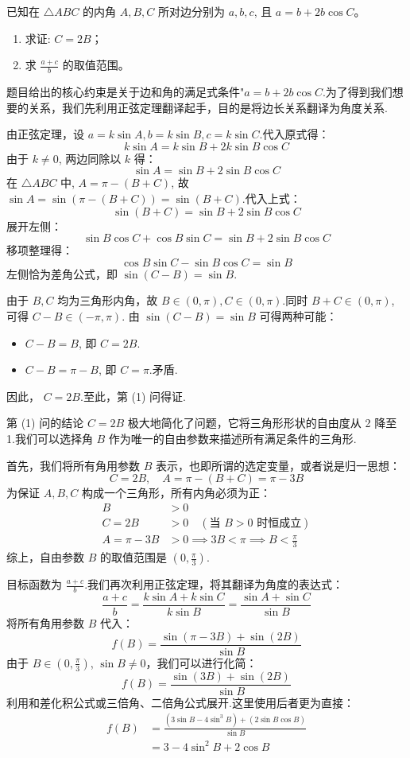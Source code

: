\begin{prob}[source={2023 年衡水中学第三次综合素养评价第 18 题}, topic={取值范围}]
已知在 $\triangle ABC$ 的内角 $A,B,C$ 所对边分别为 $a,b,c$, 且 $a=b+2b\cos C$。
\begin{enumerate}
	\item[(1)] 求证: $C=2B$；
	\item[(2)] 求 $\frac{a+c}{b}$ 的取值范围。
\end{enumerate}
\end{prob}
\begin{prob-sol}
题目给出的核心约束是关于边和角的满足式条件"$a=b+2b\cos C$.为了得到我们想要的关系，我们先利用正弦定理翻译起手，目的是将边长关系翻译为角度关系.

由正弦定理，设 $a=k\sin A, b=k\sin B, c=k\sin C$.代入原式得：
\[
k\sin A = k\sin B + 2k\sin B \cos C
\]
由于 $k \neq 0$, 两边同除以 $k$ 得：
\[
\sin A = \sin B + 2\sin B \cos C
\]
在 $\triangle ABC$ 中, $A = \pi-(B+C)$, 故 $\sin A = \sin(\pi-(B+C)) = \sin(B+C)$.代入上式：
\[
\sin(B+C) = \sin B + 2\sin B \cos C
\]
展开左侧：
\[
\sin B \cos C + \cos B \sin C = \sin B + 2\sin B \cos C
\]
移项整理得：
\[
\cos B \sin C - \sin B \cos C = \sin B
\]
左侧恰为差角公式，即 $\sin(C-B) = \sin B$.

由于 $B,C$ 均为三角形内角，故 $B \in (0,\pi), C \in (0,\pi)$.同时 $B+C \in (0,\pi)$, 可得 $C-B \in (-\pi, \pi)$.
由 $\sin(C-B)=\sin B$ 可得两种可能：
\begin{itemize}
	\item $C-B = B$, 即 $C=2B$.
	\item $C-B = \pi - B$, 即 $C=\pi$.矛盾.
\end{itemize}
因此， $C=2B$.至此，第 (1) 问得证.

第 (1) 问的结论 $C=2B$ 极大地简化了问题，它将三角形形状的自由度从 2 降至 1.我们可以选择角 $B$ 作为唯一的自由参数来描述所有满足条件的三角形.

首先，我们将所有角用参数 $B$ 表示，也即所谓的选定变量，或者说是归一思想：
\[
C=2B, \quad A = \pi - (B+C) = \pi - 3B
\]
为保证 $A,B,C$ 构成一个三角形，所有内角必须为正：
\begin{align*}
	B &> 0 \\
	C = 2B &> 0 \quad (\text{当 } B>0 \text{ 时恒成立}) \\
	A = \pi - 3B &> 0 \implies 3B < \pi \implies B < \frac{\pi}{3}
\end{align*}
综上，自由参数 $B$ 的取值范围是 $(0, \frac{\pi}{3})$.

目标函数为 $\frac{a+c}{b}$.我们再次利用正弦定理，将其翻译为角度的表达式：
\[
\frac{a+c}{b} = \frac{k\sin A + k\sin C}{k\sin B} = \frac{\sin A + \sin C}{\sin B}
\]
将所有角用参数 $B$ 代入：
\[
f(B) = \frac{\sin(\pi-3B)+\sin(2B)}{\sin B}
\]
由于 $B \in (0, \frac{\pi}{3})$, $\sin B \neq 0$，我们可以进行化简：
\[
f(B) = \frac{\sin(3B)+\sin(2B)}{\sin B}
\]
利用和差化积公式或三倍角、二倍角公式展开.这里使用后者更为直接：
\begin{align*}
	f(B) &= \frac{(3\sin B - 4\sin^3 B) + (2\sin B \cos B)}{\sin B} \\
	&= 3 - 4\sin^2 B + 2\cos B
\end{align*}


\end{prob-sol}

